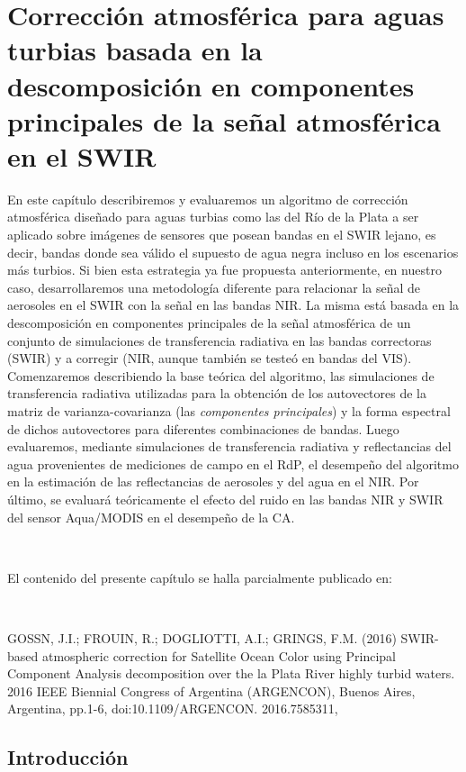 \chapter[CA basada en PCA de la señal atmosférica]{Corrección atmosférica para aguas turbias basada en la descomposición en componentes principales de la señal atmosférica en el SWIR}
\label{pca}

En este capítulo describiremos y evaluaremos un algoritmo de corrección atmosférica diseñado para aguas turbias como las del Río de la Plata a ser aplicado sobre imágenes de sensores que posean bandas en el SWIR lejano, es decir, bandas donde sea válido el supuesto de agua negra incluso en los escenarios más turbios. Si bien esta estrategia ya fue propuesta anteriormente, en nuestro caso, desarrollaremos una metodología diferente para relacionar la señal de aerosoles en el SWIR con la señal en las bandas NIR. La misma está basada en la descomposición en componentes principales de la señal atmosférica de un conjunto de simulaciones de transferencia radiativa en las bandas correctoras (SWIR) y a corregir (NIR, aunque también se testeó en bandas del VIS). Comenzaremos describiendo la base teórica del algoritmo, las simulaciones de transferencia radiativa utilizadas para la obtención de los autovectores de la matriz de varianza-covarianza (las \textit{componentes principales}) y la forma espectral de dichos autovectores para diferentes combinaciones de bandas. Luego evaluaremos, mediante simulaciones de transferencia radiativa y reflectancias del agua provenientes de mediciones de campo en el RdP, el desempeño del algoritmo en la estimación de las reflectancias de aerosoles y del agua en el NIR. Por último, se evaluará teóricamente el efecto del ruido en las bandas NIR y SWIR del sensor Aqua/MODIS en el desempeño de la CA.

$\quad$

\noindent

El contenido del presente capítulo se halla parcialmente publicado en:

$\quad$

\noindent
GOSSN, J.I.; FROUIN, R.; DOGLIOTTI, A.I.; GRINGS, F.M. (2016) SWIR-based atmospheric correction for Satellite Ocean Color using Principal Component Analysis decomposition over the la Plata River highly turbid waters. 2016 IEEE Biennial Congress of Argentina (ARGENCON), Buenos Aires, Argentina, pp.1-6, doi:10.1109/ARGENCON. 2016.7585311, \cite{gossn2016}


\section{Introducción}
\label{pca:s:intro}


